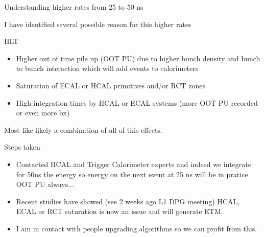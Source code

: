 \documentclass[8pt]{beamer}
\begin{document}
\begin{frame}{Understanding higher rates from 25 to 50 ns}
 
I have identified several possible reason for this higher rates
\begin{block}{HLT}
 
\begin{itemize}
  \item Higher out of time pile up (OOT PU) due to higher bunch density and bunch to bunch interaction which will add events to calorimeters
  \item Saturation of ECAL or HCAL primitives and/or RCT zones
  \item High integration times by HCAL or ECAL systems (more OOT PU recorded or even more bx) 
\end{itemize}

\end{block}
 
Most like likely a combination of all of this effects.
 
\begin{block}{Steps taken}
 
\begin{itemize}
  \item Contacted HCAL and Trigger Calorimeter experts and indeed we integrate for 50ns the energy so energy on the next event at 25 ns will be in pratice OOT PU always...
  \item Recent studies have showed (see 2 weeks ago L1 DPG meeting) HCAL, ECAL or RCT saturation is now an issue and will generate ETM.
  \item I am in contact with people upgrading algorithms so we can profit from this.
\end{itemize}

\end{block} 
 
\end{frame}
\end{document}
